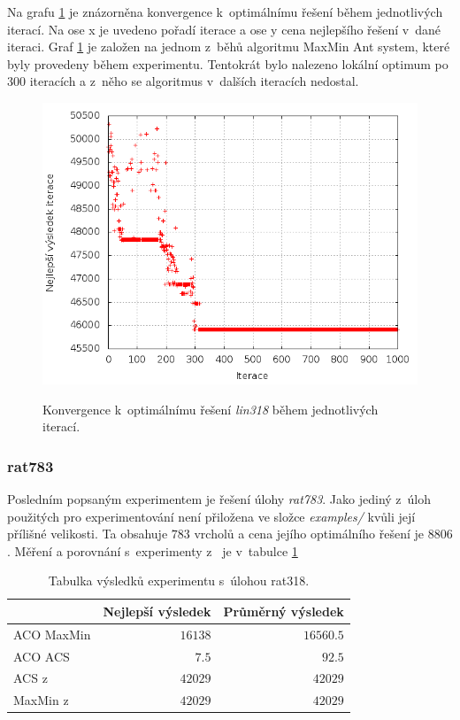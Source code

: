 \documentclass[a4paper, 12pt]{article}
\begin{document}
Na grafu \ref{fig:best_lin} je znázorněna konvergence k~optimálnímu řešení během jednotlivých iterací. Na ose x je uvedeno pořadí iterace a ose y
cena nejlepšího řešení v~dané iteraci. Graf \ref{fig:best_lin} je založen na jednom z~běhů algoritmu MaxMin Ant system, které byly provedeny během experimentu.
Tentokrát bylo nalezeno lokální optimum po 300 iteracích a z~něho se algoritmus v~dalších iteracích nedostal.
\begin{figure}[bt]
\begin{center}
\scalebox{0.6}
{
  \includegraphics{imgs/best_lin.png}
}
\caption{
Konvergence k~optimálnímu řešení \emph{lin318} během jednotlivých iterací.}
\label{fig:best_lin}
\end{center}
\end{figure}

\subsubsection{rat783}
Posledním popsaným experimentem je řešení úlohy \emph{rat783}. Jako jediný z~úloh použitých pro experimentování není přiložena ve složce \emph{examples/}
kvůli její přílišné velikosti.
Ta obsahuje $783$ vrcholů a cena jejího optimálního řešení je $8 806$ \cite{aco:acs}. 
Měření a porovnání s~experimenty z~\cite{aco:maxmintsp,aco:acs} je v~tabulce \ref{rat783}
\begin{table}[tb]
\begin{center}
  \begin{tabular}{ | l | r | r |}
   \hline
    & \textbf{Nejlepší výsledek} & \textbf{Průměrný výsledek} \\ \hline \hline
    ACO MaxMin & $16138$ & $16560.5$ \\ \hline
    ACO ACS & $7.5$ & $92.5$ \\ \hline
    ACS z~\cite{aco:acs} & $42 029$ & $42 029$ \\ \hline
    MaxMin z~\cite{aco:maxmintsp} & $42 029$ & $42 029$\\ \hline
   \end{tabular}
   \caption{Tabulka výsledků experimentu s~úlohou rat318.}
   \label{rat783}
\end{center}
\end{table}
\end{document}
